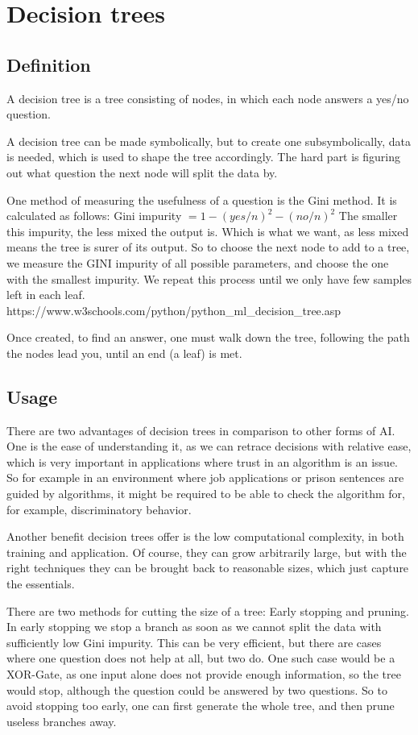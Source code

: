 \section{Decision trees}
\label{sec:decisionTrees}
\subsection{Definition}

A decision tree is a tree consisting of nodes, in which each node answers a yes/no question. 

A decision tree can be made symbolically, but to create one subsymbolically, data is needed, which is used to shape the tree accordingly.
The hard part is figuring out what question the next node will split the data by. 

One method of measuring the usefulness of a question is the Gini method.
It is calculated as follows: Gini impurity $= 1-(yes/n)^2-(no/n)^2$
The smaller this impurity, the less mixed the output is. Which is what we want, as less mixed means the tree is surer of its output. 
So to choose the next node to add to a tree, we measure the GINI impurity of all possible parameters, and choose the one with the smallest impurity. We repeat this process until we only have few samples left in each leaf. 
https://www.w3schools.com/python/python_ml_decision_tree.asp

Once created, to find an answer, one must walk down the tree, following the path the nodes lead you, until an end (a leaf) is met.

\subsection{Usage}
There are two advantages of decision trees in comparison to other forms of AI. One is the ease of understanding it, as we can retrace decisions with relative ease, which is very important in applications where trust in an algorithm is an issue. So for example in an environment where job applications or prison sentences are guided by algorithms, it might be required to be able to check the algorithm for, for example, discriminatory behavior.

Another benefit decision trees offer is the low computational complexity, in both training and application. Of course, they can grow arbitrarily large, but with the right techniques they can be brought back to reasonable sizes, which just capture the essentials.

There are two methods for cutting the size of a tree: Early stopping and pruning. In early stopping we stop a branch as soon as we cannot split the data with sufficiently low Gini impurity. This can be very efficient, but there are cases where one question does not help at all, but two do. One such case would be a XOR-Gate, as one input alone does not provide enough information, so the tree would stop, although the question could be answered by two questions.
So to avoid stopping too early, one can first generate the whole tree, and then prune useless branches away.

